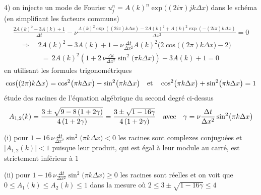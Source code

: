 \documentclass[12pt,a4paper]{article}
\begin{document}
4) on injecte un mode de Fourier $u_j^n=A(k)^n \exp\!\big( (2 i \pi) j k \Delta x \big)$ dans le sch\'ema 
(en simplifiant les facteurs communs)
$$
\begin{array}{l}
\displaystyle \frac{2 A(k)^2 - 3 A(k) + 1}{\Delta t} - \nu \frac{A(k)^2 \exp((2 i \pi) k \Delta x) - 2 A(k)^2 + A(k)^2 \exp(-(2 i \pi) k \Delta x)}{\Delta x^2} = 0 \\[2ex]
\quad \Longrightarrow \quad \displaystyle 2 A(k)^2 - 3 A(k) + 1 - \nu \frac{\Delta t}{\Delta x^2} A(k)^2 \big( 2 \cos\!\big( (2 \pi) k \Delta x \big) - 2 \big)  \\[2ex]
\qquad \qquad =\, \displaystyle 2 A(k)^2 \left( 1 + 2\,\nu \frac{\Delta t}{\Delta x^2} \sin^2\!\big( \pi k \Delta x \big) \right) - 3 A(k) + 1 = 0
\end{array}
$$
en utilisant les formules trigonom\'etriques
$$ \cos\!\big( (2 \pi) k \Delta x \big) = \cos^2\!\big( \pi k \Delta x \big) - \sin^2\!\big( \pi k \Delta x \big) \quad {\rm et} \quad \cos^2\!\big( \pi k \Delta x \big) + \sin^2\!\big( \pi k \Delta x \big) = 1 $$
\'etude des racines de l'\'equation alg\'ebrique du second degr\'e ci-dessus
$$ A_{1,2}(k) = \frac{3 \pm \sqrt{ 9 - 8 \left( 1 + 2 \gamma \right) }}{4 \left( 1 + 2 \gamma \right)} = \frac{3 \pm \sqrt{ 1 - 16 \gamma }}{4 \left( 1 + 2 \gamma \right)} \quad {\rm avec} \quad \gamma = \nu \frac{\Delta t}{\Delta x^2} \sin^2\!\big( \pi k \Delta x \big) $$

\noindent (i) pour $\displaystyle 1 - 16\,\nu \frac{\Delta t}{\Delta x^2} \sin^2\!\big( \pi k \Delta x \big) < 0$ les racines sont complexes conjugu\'ees et $\big| A_{1,2}(k) \big| < 1$ puisque leur produit, qui est \'egal à leur module au carr\'e, est strictement inférieur \`a $1$

\noindent (ii) pour $\displaystyle 1 - 16\,\nu \frac{\Delta t}{\Delta x^2} \sin^2\!\big( \pi k \Delta x \big) \geq 0$ les racines sont r\'eelles et on voit que $0 \leq A_1(k) \leq A_2(k) \leq 1$ dans la mesure o\`u $ 2 \leq 3 \pm \sqrt{1-16\gamma} \leq 4$
\end{document}

